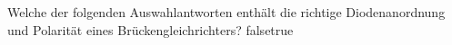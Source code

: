     {Welche der folgenden Auswahlantworten enthält die richtige Diodenanordnung und Polarität eines Brückengleichrichters?}
    {}
    {}
    {}
    {}
    {false}{true}